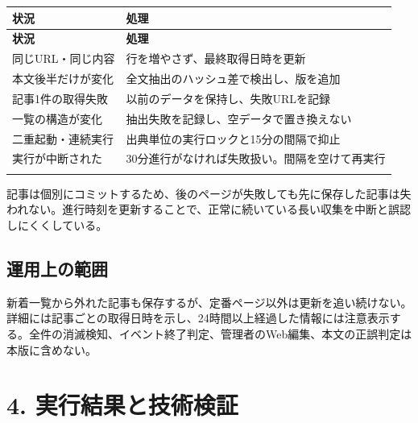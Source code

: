 \documentclass[a4paper,10pt]{ltjsarticle}
\begin{document}
{\small\begin{longtable}{@{}>{\raggedright\arraybackslash}p{}>{\raggedright\arraybackslash}p{}@{}}

\rowcolor{Pale}\textbf{状況} & \textbf{処理} \\ \midrule

\endfirsthead

\rowcolor{Pale}\textbf{状況} & \textbf{処理} \\ \midrule\endhead

同じURL・同じ内容 & 行を増やさず、最終取得日時を更新 \\ \addlinespace[3pt]

本文後半だけが変化 & 全文抽出のハッシュ差で検出し、版を追加 \\ \addlinespace[3pt]

記事1件の取得失敗 & 以前のデータを保持し、失敗URLを記録 \\ \addlinespace[3pt]

一覧の構造が変化 & 抽出失敗を記録し、空データで置き換えない \\ \addlinespace[3pt]

二重起動・連続実行 & 出典単位の実行ロックと15分の間隔で抑止 \\ \addlinespace[3pt]

実行が中断された & 30分進行がなければ失敗扱い。間隔を空けて再実行 \\ \addlinespace[3pt]

\bottomrule\end{longtable}}

記事は個別にコミットするため、後のページが失敗しても先に保存した記事は失われない。進行時刻を更新することで、正常に続いている長い収集を中断と誤認しにくくしている。


\subsection*{運用上の範囲}

新着一覧から外れた記事も保存するが、定番ページ以外は更新を追い続けない。詳細には記事ごとの取得日時を示し、24時間以上経過した情報には注意表示する。全件の消滅検知、イベント終了判定、管理者のWeb編集、本文の正誤判定は本版に含めない。


\clearpage

\section*{4. 実行結果と技術検証}
\end{document}
